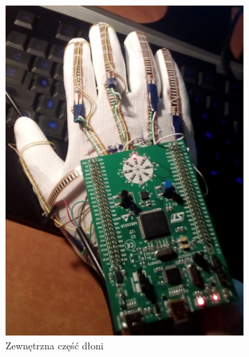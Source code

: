 \documentclass[12pt,a4paper]{article}
\begin{document}
\begin{figure}[!htb]
\centering
\begin{subfigure}{.5\textwidth}
	\centering
	\includegraphics[width=.9\textwidth]{images/gotowa.jpg}
	\caption{Zewnętrzna część dłoni}
	\label{fig:gotowa}
\end{subfigure}%
\begin{subfigure}{.5\textwidth}
	\centering

\end{subfigure}
\end{figure}
\end{document}
